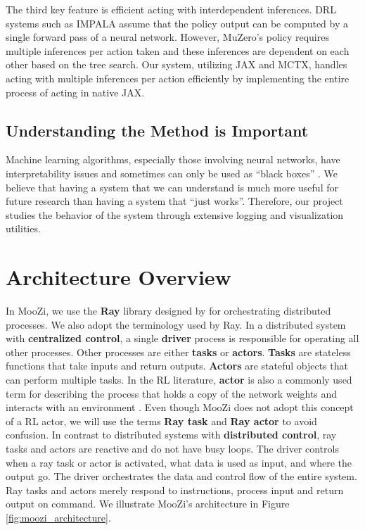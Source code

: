 The third key feature is efficient acting with interdependent inferences.
DRL systems such as IMPALA assume that the policy output can be computed by a single forward pass of a neural network.
However, MuZero's policy requires multiple inferences per action taken and these inferences are dependent on each other based on the tree search.
Our system, utilizing JAX and MCTX, handles acting with multiple inferences per action efficiently by implementing the entire process of acting in native JAX.

\subsection{Understanding the Method is Important}
Machine learning algorithms, especially those involving neural networks, have interpretability issues and sometimes can only be used as ``black boxes'' \cite{ExplainableAIReview_Linardatos.Papastefanopoulos.ea_2021}.
We believe that having a system that we can understand is much more useful for future research than having a system that ``just works''.
Therefore, our project studies the behavior of the system through extensive logging and visualization utilities.

\section{Architecture Overview}
In MooZi, we use the \textbf{Ray} library designed by \citeauthor{RayDistributedFramework_Moritz.Nishihara.ea_2018} \cite{RayDistributedFramework_Moritz.Nishihara.ea_2018} for orchestrating distributed processes.
We also adopt the terminology used by Ray.
In a distributed system with \textbf{centralized control}, a single \textbf{driver} process is responsible for operating all other processes.
Other processes are either \textbf{tasks} or \textbf{actors}.
\textbf{Tasks} are stateless functions that take inputs and return outputs.
\textbf{Actors} are stateful objects that can perform multiple tasks.
In the RL literature, \textbf{actor} is also a commonly used term for describing the process that holds a copy of the network weights and interacts with an environment \cite{SEEDRLScalable_Espeholt.Marinier.ea_2020, IMPALAScalableDistributed_Espeholt.Soyer.ea_2018}.
Even though MooZi does not adopt this concept of a RL actor, we will use the terms \textbf{Ray task} and \textbf{Ray actor} to avoid confusion.
In contrast to distributed systems with \textbf{distributed control}, ray tasks and actors are reactive and do not have busy loops.
The driver controls when a ray task or actor is activated, what data is used as input, and where the output go.
The driver orchestrates the data and control flow of the entire system.
Ray tasks and actors merely respond to instructions, process input and return output on command.
We illustrate MooZi's architecture in Figure \ref{fig:moozi_architecture}.

